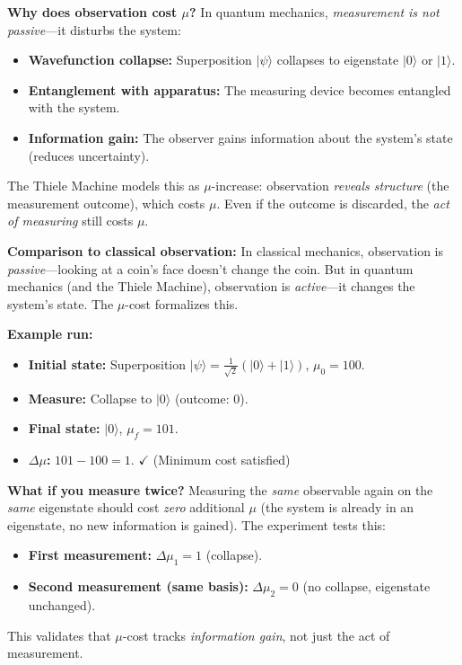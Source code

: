 \textbf{Why does observation cost $\mu$?} In quantum mechanics, \textit{measurement is not passive}---it disturbs the system:
\begin{itemize}
    \item \textbf{Wavefunction collapse:} Superposition $|\psi\rangle$ collapses to eigenstate $|0\rangle$ or $|1\rangle$.
    \item \textbf{Entanglement with apparatus:} The measuring device becomes entangled with the system.
    \item \textbf{Information gain:} The observer gains information about the system's state (reduces uncertainty).
\end{itemize}
The Thiele Machine models this as $\mu$-increase: observation \textit{reveals structure} (the measurement outcome), which costs $\mu$. Even if the outcome is discarded, the \textit{act of measuring} still costs $\mu$.

\textbf{Comparison to classical observation:} In classical mechanics, observation is \textit{passive}---looking at a coin's face doesn't change the coin. But in quantum mechanics (and the Thiele Machine), observation is \textit{active}---it changes the system's state. The $\mu$-cost formalizes this.

\textbf{Example run:}
\begin{itemize}
    \item \textbf{Initial state:} Superposition $|\psi\rangle = \frac{1}{\sqrt{2}}(|0\rangle + |1\rangle)$, $\mu_0 = 100$.
    \item \textbf{Measure:} Collapse to $|0\rangle$ (outcome: 0).
    \item \textbf{Final state:} $|0\rangle$, $\mu_f = 101$.
    \item \textbf{$\Delta\mu$:} $101 - 100 = 1$. $\checkmark$ (Minimum cost satisfied)
\end{itemize}

\textbf{What if you measure twice?} Measuring the \textit{same} observable again on the \textit{same} eigenstate should cost \textit{zero} additional $\mu$ (the system is already in an eigenstate, no new information is gained). The experiment tests this:
\begin{itemize}
    \item \textbf{First measurement:} $\Delta\mu_1 = 1$ (collapse).
    \item \textbf{Second measurement (same basis):} $\Delta\mu_2 = 0$ (no collapse, eigenstate unchanged).
\end{itemize}
This validates that $\mu$-cost tracks \textit{information gain}, not just the act of measurement.

